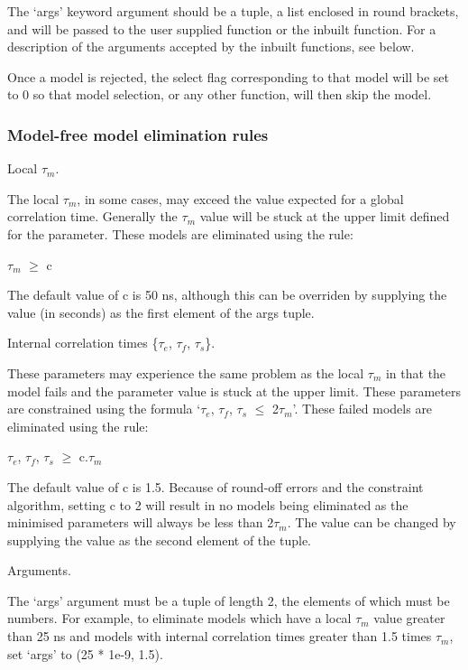 The `args' keyword argument should be a tuple, a list enclosed in round brackets, and will
be passed to the user supplied function or the inbuilt function.  For a description of the
arguments accepted by the inbuilt functions, see below.

Once a model is rejected, the select flag corresponding to that model will be set to 0 so
that model selection, or any other function, will then skip the model.



\subsubsection{Model-free model elimination rules}

Local $\tau_m$.

The local $\tau_m$, in some cases, may exceed the value expected for a global correlation time.
Generally the $\tau_m$ value will be stuck at the upper limit defined for the parameter.  These
models are eliminated using the rule:

    $\tau_m$ $\ge$ c

The default value of c is 50 ns, although this can be overriden by supplying the value (in
seconds) as the first element of the args tuple.


Internal correlation times \{$\tau_e$, $\tau_f$, $\tau_s$\}.

These parameters may experience the same problem as the local $\tau_m$ in that the model fails and
the parameter value is stuck at the upper limit.  These parameters are constrained using the
formula `$\tau_e$, $\tau_f$, $\tau_s$ $\le$ 2$\tau_m$'.  These failed models are eliminated using the rule:

    $\tau_e$, $\tau_f$, $\tau_s$ $\ge$ c.$\tau_m$

The default value of c is 1.5.  Because of round-off errors and the constraint algorithm,
setting c to 2 will result in no models being eliminated as the minimised parameters will
always be less than 2$\tau_m$.  The value can be changed by supplying the value as the second
element of the tuple.


Arguments.

The `args' argument must be a tuple of length 2, the elements of which must be numbers.  For
example, to eliminate models which have a local $\tau_m$ value greater than 25 ns and models with
internal correlation times greater than 1.5 times $\tau_m$, set `args' to (25 * 1e-9, 1.5).


\newpage

